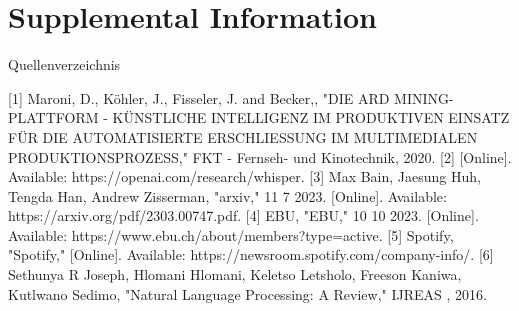 \chapter{Supplemental Information}\label{app:supplemental-information}


Quellenverzeichnis


[1] 	Maroni, D., Köhler, J., Fisseler, J. and Becker,, "DIE ARD MINING-PLATTFORM - KÜNSTLICHE INTELLIGENZ IM PRODUKTIVEN EINSATZ FÜR DIE AUTOMATISIERTE ERSCHLIESSUNG IM MULTIMEDIALEN PRODUKTIONSPROZESS," FKT - Fernseh- und Kinotechnik, 2020. 
[2] 	[Online]. Available: https://openai.com/research/whisper.
[3] 	Max Bain, Jaesung Huh, Tengda Han, Andrew Zisserman, "arxiv," 11 7 2023. [Online]. Available: https://arxiv.org/pdf/2303.00747.pdf.
[4] 	EBU, "EBU," 10 10 2023. [Online]. Available: https://www.ebu.ch/about/members?type=active.
[5] 	Spotify, "Spotify," [Online]. Available: https://newsroom.spotify.com/company-info/.
[6] 	Sethunya R Joseph, Hlomani Hlomani, Keletso Letsholo, Freeson Kaniwa, Kutlwano Sedimo, "Natural Language Processing: A Review," IJREAS , 2016. 




